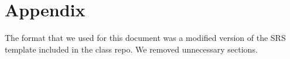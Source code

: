 \documentclass[12pt, titlepage]{article}
\begin{document}




\newpage

\section{Appendix}

The format that we used for this document was a modified version of the SRS template included in the class repo. We removed unnecessary sections.


\end{document}
